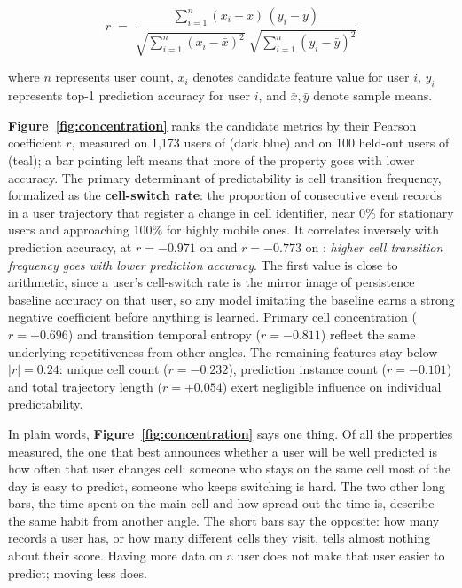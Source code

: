 \begin{equation}
  r \;=\;
  \frac{\displaystyle\sum_{i=1}^{n} (x_i - \bar{x})\,(y_i - \bar{y})}
       {\sqrt{\displaystyle\sum_{i=1}^{n} (x_i - \bar{x})^2}\;
        \sqrt{\displaystyle\sum_{i=1}^{n} (y_i - \bar{y})^2}}
  \label{eq:pearson}
\end{equation}

where $n$ represents user count, $x_i$ denotes candidate feature value for user $i$, $y_i$ represents top-1 prediction accuracy for user $i$, and $\bar{x}, \bar{y}$ denote sample means.

\bigskip

\textbf{Figure~\ref{fig:concentration}} ranks the candidate metrics by their Pearson coefficient $r$, measured on 1,173 users of \Draw{} (dark blue) and on 100 held-out users of \Dmob{} (teal); a bar pointing left means that more of the property goes with lower accuracy. The primary determinant of predictability is cell transition frequency, formalized as the \textbf{cell-switch rate}: the proportion of consecutive event records in a user trajectory that register a change in cell identifier, near 0\% for stationary users and approaching 100\% for highly mobile ones. It correlates inversely with prediction accuracy, at $r = -0.971$ on \Draw{} and $r = -0.773$ on \Dmob{}: \emph{higher cell transition frequency goes with lower prediction accuracy}. The first value is close to arithmetic, since a user's cell-switch rate is the mirror image of persistence baseline accuracy on that user, so any model imitating the baseline earns a strong negative coefficient before anything is learned. Primary cell concentration ($r = +0.696$) and transition temporal entropy ($r = -0.811$) reflect the same underlying repetitiveness from other angles. The remaining features stay below $|r| = 0.24$: unique cell count ($r = -0.232$), prediction instance count ($r = -0.101$) and total trajectory length ($r = +0.054$) exert negligible influence on individual predictability.



In plain words, \textbf{Figure~\ref{fig:concentration}} says one thing. Of all the properties measured, the one that best announces whether a user will be well predicted is how often that user changes cell: someone who stays on the same cell most of the day is easy to predict, someone who keeps switching is hard. The two other long bars, the time spent on the main cell and how spread out the time is, describe the same habit from another angle. The short bars say the opposite: how many records a user has, or how many different cells they visit, tells almost nothing about their score. Having more data on a user does not make that user easier to predict; moving less does.

